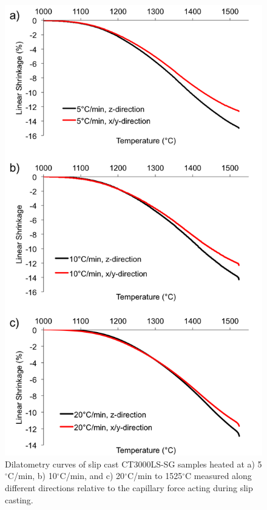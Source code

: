 \newpage
\begin{figure}[H]
	\centering
	\includegraphics{Chapter-6/Figures/Figure1.png}
	\caption{Dilatometry curves of slip cast CT3000LS-SG samples heated at a) 5$^{\circ}$C/min, b) 10$^{\circ}$C/min, and c) 20$^{\circ}$C/min to 1525$^{\circ}$C measured along different directions relative to the capillary force acting during slip casting.}
	\label{Ch6-figure:Figure1}
\end{figure}

